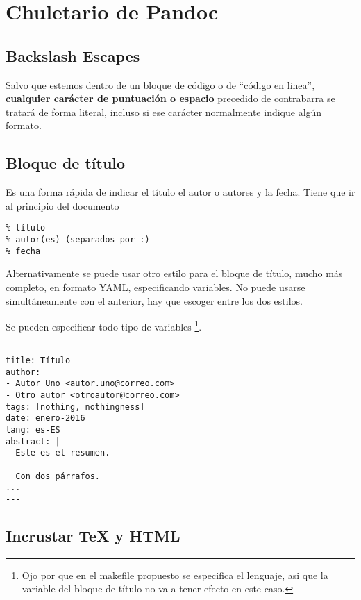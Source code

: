 \documentclass[12pt,spanish,]{article}
\begin{document}
\section{Chuletario de Pandoc}\label{chuletario-de-pandoc}

\subsection{Backslash Escapes}\label{backslash-escapes}

Salvo que estemos dentro de un bloque de código o de ``código en
linea'', \textbf{cualquier carácter de puntuación o espacio} precedido
de contrabarra se tratará de forma literal, incluso si ese carácter
normalmente indique algún formato.

\subsection{Bloque de título}\label{bloque-de-tuxedtulo}

Es una forma rápida de indicar el título el autor o autores y la fecha.
Tiene que ir al principio del documento

\begin{verbatim}
% título
% autor(es) (separados por :)
% fecha
\end{verbatim}

Alternativamente se puede usar otro estilo para el bloque de título,
mucho más completo, en formato
\href{https://en.wikipedia.org/wiki/YAML}{YAML}, especificando
variables. No puede usarse simultáneamente con el anterior, hay que
escoger entre los dos estilos.

Se pueden especificar todo tipo de variables \footnote{Ojo por que en el
  makefile propuesto se especifica el lenguaje, asi que la variable del
  bloque de título no va a tener efecto en este caso.}.

\begin{verbatim}
---
title: Título
author:
- Autor Uno <autor.uno@correo.com>
- Otro autor <otroautor@correo.com>
tags: [nothing, nothingness]
date: enero-2016
lang: es-ES
abstract: |
  Este es el resumen.

  Con dos párrafos.
...
---
\end{verbatim}

\subsection{Incrustar TeX y HTML}\label{incrustar-tex-y-html}
\end{document}
